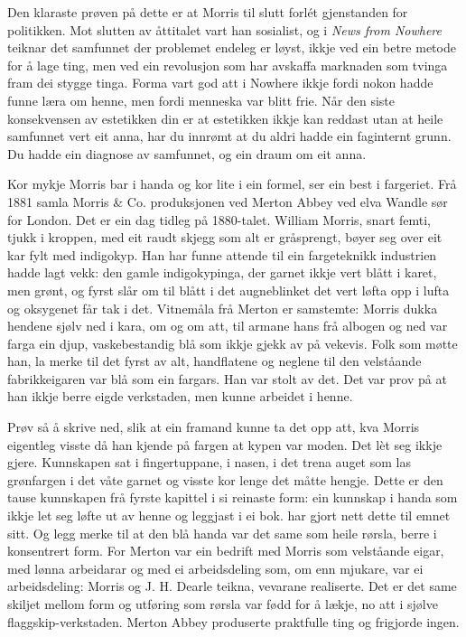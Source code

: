 Den klaraste prøven på dette er at Morris til slutt forlét gjenstanden for politikken. Mot slutten av åttitalet vart han sosialist, og i \textit{News from Nowhere} teiknar \textcite{morris1890news} det samfunnet der problemet endeleg er løyst, ikkje ved ein betre metode for å lage ting, men ved ein revolusjon som har avskaffa marknaden som tvinga fram dei stygge tinga. Forma vart god att i Nowhere ikkje fordi nokon hadde funne læra om henne, men fordi menneska var blitt frie. Når den siste konsekvensen av estetikken din er at estetikken ikkje kan reddast utan at heile samfunnet vert eit anna, har du innrømt at du aldri hadde ein faginternt grunn. Du hadde ein diagnose av samfunnet, og ein draum om eit anna.

Kor mykje Morris bar i handa og kor lite i ein formel, ser ein best i fargeriet. Frå 1881 samla Morris \& Co. produksjonen ved Merton Abbey ved elva Wandle sør for London. Det er ein dag tidleg på 1880-talet. William Morris, snart femti, tjukk i kroppen, med eit raudt skjegg som alt er gråsprengt, bøyer seg over eit kar fylt med indigokyp. Han har funne attende til ein fargeteknikk industrien hadde lagt vekk: den gamle indigokypinga, der garnet ikkje vert blått i karet, men grønt, og fyrst slår om til blått i det augneblinket det vert løfta opp i lufta og oksygenet får tak i det. Vitnemåla frå Merton er samstemte: Morris dukka hendene sjølv ned i kara, om og om att, til armane hans frå albogen og ned var farga ein djup, vaskebestandig blå som ikkje gjekk av på vekevis. Folk som møtte han, la merke til det fyrst av alt, handflatene og neglene til den velståande fabrikkeigaren var blå som ein fargars. Han var stolt av det. Det var prov på at han ikkje berre eigde verkstaden, men kunne arbeidet i henne.

Prøv så å skrive ned, slik at ein framand kunne ta det opp att, kva Morris eigentleg visste då han kjende på fargen at kypen var moden. Det lèt seg ikkje gjere. Kunnskapen sat i fingertuppane, i nasen, i det trena auget som las grønfargen i det våte garnet og visste kor lenge det måtte hengje. Dette er den tause kunnskapen frå fyrste kapittel i si reinaste form: ein kunnskap i handa som ikkje let seg løfte ut av henne og leggjast i ei bok. \textcite{adamson2007craft} har gjort nett dette til emnet sitt. Og legg merke til at den blå handa var det same som heile rørsla, berre i konsentrert form. For Merton var ein bedrift med Morris som velståande eigar, med lønna arbeidarar og med ei arbeidsdeling som, om enn mjukare, var ei arbeidsdeling: Morris og J. H. Dearle teikna, vevarane realiserte. Det er det same skiljet mellom form og utføring som rørsla var fødd for å lækje, no att i sjølve flaggskip-verkstaden. Merton Abbey produserte praktfulle ting og frigjorde ingen.

